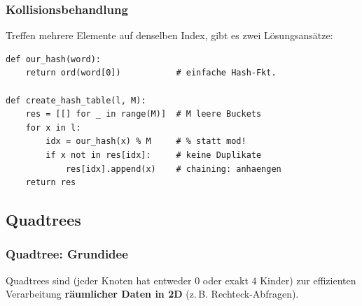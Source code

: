 \subsubsection{Kollisionsbehandlung}
\begin{contentbox}
Treffen mehrere Elemente auf denselben Index, gibt es zwei Lösungsansätze:
\begin{factlist}
\end{factlist}
\end{contentbox}
\begin{codebox}
\begin{lstlisting}[style=CodeExpert]
def our_hash(word):
    return ord(word[0])           # einfache Hash-Fkt.

def create_hash_table(l, M):
    res = [[] for _ in range(M)]  # M leere Buckets
    for x in l:
        idx = our_hash(x) % M     # % statt mod!
        if x not in res[idx]:     # keine Duplikate
            res[idx].append(x)    # chaining: anhaengen
    return res
\end{lstlisting}
\end{codebox}


\subsection{Quadtrees}\label{sec:09-quadtrees}

\subsubsection{Quadtree: Grundidee}
\begin{defbox}[Quadtree]
Quadtrees sind  (jeder Knoten hat entweder $0$ oder exakt $4$ Kinder) zur effizienten Verarbeitung \textbf{räumlicher Daten in 2D} (z.\,B. Rechteck-Abfragen).
\end{defbox}

